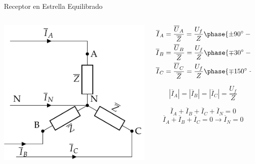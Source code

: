 \documentclass[aspectratio=169, usenames,svgnames,dvipsnames]{beamer}
\begin{document}
\begin{frame}[label={sec:org4e34253}]{Receptor en Estrella Equilibrado}
\begin{columns}
\begin{column}{0.5\columnwidth}
\begin{center}
\includegraphics[width=.9\linewidth]{../figs/EstrellaEquilibrado_Receptor.pdf}
\end{center}
\end{column}

\begin{column}{0.5\columnwidth}
\begin{align*}
  \overline{I}_A &= \frac{\overline{U}_A}{\overline{Z}} = \frac{U_f}{Z}\phase{\ang{\pm 90} - \theta} \\
  \overline{I}_B &= \frac{\overline{U}_B}{\overline{Z}} = \frac{U_f}{Z}\phase{\ang{\mp 30} - \theta}\\
  \overline{I}_C &= \frac{\overline{U}_C}{\overline{Z}} = \frac{U_f}{Z}\phase{\ang{\mp 150} - \theta}
\end{align*}


\[
  \boxed{|\overline{I}_A| = |\overline{I}_B| = |\overline{I}_C| = \frac{U_f}{Z}}
\]

\[
  \overline{I}_A  + \overline{I}_B + \overline{I}_C + \overline{I}_N = 0
\]
\[
   \overline{I}_A  + \overline{I}_B + \overline{I}_C  = 0 \rightarrow \boxed{\overline{I}_N = 0}
\]
\end{column}
\end{columns}
\end{frame}
\end{document}
